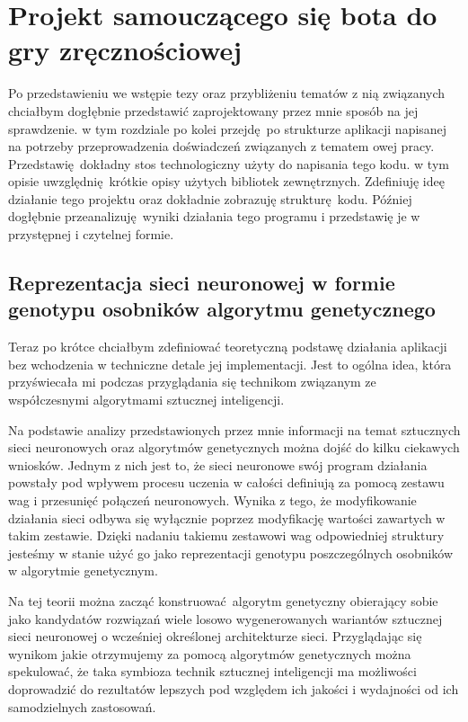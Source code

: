 \documentclass[12pt, oneside, a4paper]{report}
\begin{document}

\chapter{Projekt samouczącego się bota do gry zręcznościowej}

Po przedstawieniu we wstępie tezy oraz przybliżeniu tematów z nią związanych chciałbym dogłębnie przedstawić zaprojektowany przez mnie sposób na jej sprawdzenie. w tym rozdziale po kolei przejdę po strukturze aplikacji napisanej na potrzeby przeprowadzenia doświadczeń związanych z tematem owej pracy. Przedstawię dokładny stos technologiczny użyty do napisania tego kodu. w tym opisie uwzględnię krótkie opisy użytych bibliotek zewnętrznych. Zdefiniuję ideę działanie tego projektu oraz dokładnie zobrazuję strukturę kodu. Później dogłębnie przeanalizuję wyniki działania tego programu i przedstawię je w przystępnej i czytelnej formie.

\section{Reprezentacja sieci neuronowej w formie genotypu osobników algorytmu genetycznego}

Teraz po krótce chciałbym zdefiniować teoretyczną podstawę działania aplikacji bez wchodzenia w techniczne detale jej implementacji. Jest to ogólna idea, która przyświecała mi podczas przyglądania się technikom związanym ze współczesnymi algorytmami sztucznej inteligencji.

Na podstawie analizy przedstawionych przez mnie informacji na temat sztucznych sieci neuronowych oraz algorytmów genetycznych można dojść do kilku ciekawych wniosków. Jednym z nich jest to, że sieci neuronowe swój program działania powstały pod wpływem procesu uczenia w całości definiują za pomocą zestawu wag i przesunięć połączeń neuronowych. Wynika z tego, że modyfikowanie działania sieci odbywa się wyłącznie poprzez modyfikację wartości zawartych w takim zestawie. Dzięki nadaniu takiemu zestawowi wag odpowiedniej struktury jesteśmy w stanie użyć go jako reprezentacji genotypu poszczególnych osobników w algorytmie genetycznym.

Na tej teorii można zacząć konstruować algorytm genetyczny obierający sobie jako kandydatów rozwiązań wiele losowo wygenerowanych wariantów sztucznej sieci neuronowej o wcześniej określonej architekturze sieci. Przyglądając się wynikom jakie otrzymujemy za pomocą algorytmów genetycznych można spekulować, że taka symbioza technik sztucznej inteligencji ma możliwości doprowadzić do rezultatów lepszych pod względem ich jakości i wydajności od ich samodzielnych zastosowań.
\end{document}
